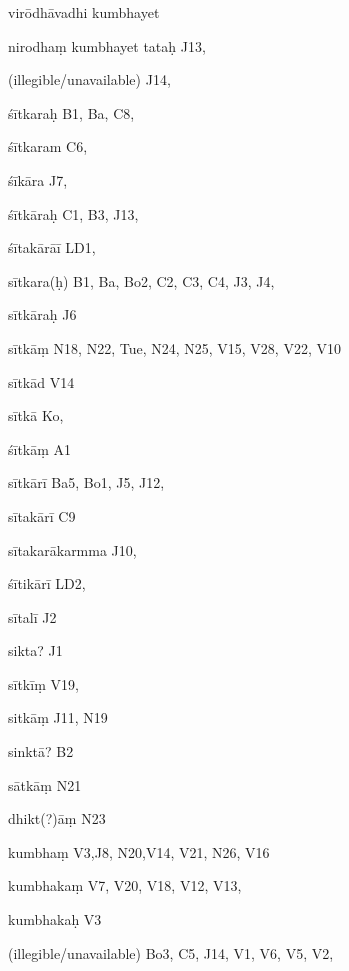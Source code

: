 \begin{ekdosis}
\begin{marma}[hp01_055]
\begin{marma}[hp02_009]
\begin{marma}[hp02_011]
      \begin{marma}[hp02_49b]
      \item[virōdhāvadhi kumbhayet]
      \item[nirodhaṃ kumbhayet tataḥ] J13, 
      \item[(illegible/unavailable)] J14,

        \begin{description}

        \end{description}
      \end{marma}



      \begin{marma}[hp02_54a]
      \item[śītkaraḥ] B1, Ba, C8, 
      \item[śītkaram] C6,
      \item[śīkāra] J7,
      \item[śītkāraḥ] C1, B3, J13, 
      \item[śītakārāī] LD1, 
      \item[sītkara(ḥ)] B1, Ba, Bo2, C2, C3, C4, J3, J4, 
      \item[sītkāraḥ] J6
      \item[sītkāṃ] N18, N22, Tue, N24, N25, V15, V28, V22, V10
      \item[sītkād] V14
      \item[sītkā] Ko,
      \item[śītkāṃ] A1
      \item[sītkārī] Ba5, Bo1, J5, J12, 
      \item[sītakārī] C9
      \item[sītakarākarmma] J10, 
      \item[śītikārī] LD2,
      \item[sītalī] J2
      \item[sikta?] J1
      \item[sītkīṃ] V19,
      \item[sitkāṃ] J11, N19
      \item[sinktā?] B2
      \item[sātkāṃ] N21
      \item[dhikt(?)āṃ] N23
      \item[kumbhaṃ] V3,J8, N20,V14, V21, N26, V16  
      \item[kumbhakaṃ] V7, V20, V18, V12, V13, 
      \item[kumbhakaḥ] V3
      \item[]
      \item[(illegible/unavailable)] Bo3, C5, J14, V1, V6, V5, V2, 
        \begin{description}


\end{description}
\end{marma}
\end{marma}
\end{marma}
\end{marma}
\end{ekdosis}
